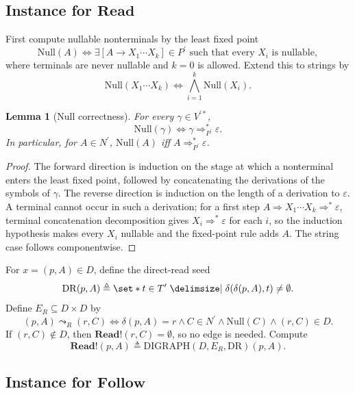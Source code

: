 \documentclass[11pt,a4paper]{article}
\theoremstyle{prettyplain}
\newtheorem{lemma}[theorem]{Lemma}
\theoremstyle{prettydef}
\def\mid{\;\delimsize\vert\;}#1%
\newcommand{\eps}{\varepsilon}
\newcommand{\Item}[2]{[#1\to #2]}
\newcommand{\Read}{\mathbf{Read}}
\newcommand{\Follow}{\mathbf{Follow}}
\begin{document}
\subsection{\texorpdfstring{Instance for \(\Read\)}{Instance for Read}}

First compute nullable nonterminals by the least fixed point
\[
\mathrm{Null}(A)
\Longleftrightarrow
\exists \Item{A}{X_1\cdots X_k}\in P^\prime
\text{ such that every }X_i\text{ is nullable},
\]
where terminals are never nullable and \(k=0\) is allowed.  Extend this to
strings by
\[
\mathrm{Null}(X_1\cdots X_k)
\Longleftrightarrow
\bigwedge_{i=1}^k \mathrm{Null}(X_i).
\]

\begin{lemma}[Null correctness]\label{lem:null-correct}
For every \(\gamma\in V^{\prime *}\),
\[
\mathrm{Null}(\gamma)
\Longleftrightarrow
\gamma\Rightarrow_{P^\prime}^*\eps .
\]
In particular, for \(A\in N^\prime\), \(\mathrm{Null}(A)\) iff
\(A\Rightarrow_{P^\prime}^*\eps\).
\end{lemma}

\begin{proof}
The forward direction is induction on the stage at which a nonterminal enters
the least fixed point, followed by concatenating the derivations of the symbols
of \(\gamma\).  The reverse direction is induction on the length of a derivation
to \(\eps\).  A terminal cannot occur in such a derivation; for a first step
\(A\Rightarrow X_1\cdots X_k\Rightarrow^*\eps\), terminal concatenation
decomposition gives \(X_i\Rightarrow^*\eps\) for each \(i\), so the induction
hypothesis makes every \(X_i\) nullable and the fixed-point rule adds \(A\).  The
string case follows componentwise.
\end{proof}

For \(x=(p,A)\in D\), define the direct-read seed
\[
\mathrm{DR}(p,A)
\triangleq
\set*{t\in T^\prime\mid \delta(\delta(p,A),t)\ne\emptyset}.
\]
Define \(E_R\subseteq D\times D\) by
\[
(p,A)\leadsto_R(r,C)
\Longleftrightarrow
\delta(p,A)=r
\land C\in N^\prime
\land \mathrm{Null}(C)
\land (r,C)\in D.
\]
If \((r,C)\notin D\), then \(\Read\mathbin{!}(r,C)=\emptyset\), so no edge is
needed.  Compute
\[
\Read\mathbin{!}(p,A)
\triangleq
\mathrm{DIGRAPH}(D,E_R,\mathrm{DR})(p,A).
\]

\subsection{\texorpdfstring{Instance for \(\Follow\)}{Instance for Follow}}
\end{document}
